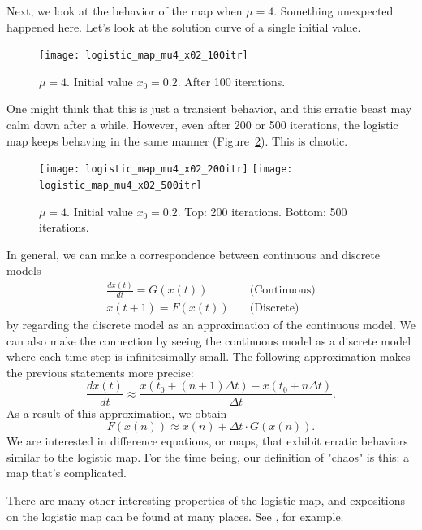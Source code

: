 \documentclass[12pt,twoside]{book}
\begin{document}
Next, we look at the behavior of the map when $\mu = 4$.
Something unexpected happened here.
Let's look at the solution curve of a single initial value.
\begin{figure}[ht]
  \begin{center}
    \texttt{[image: logistic\_map\_mu4\_x02\_100itr]}
  \end{center}
  \caption{
    $\mu = 4$. Initial value $x_0 = 0.2$. After 100 iterations.
  }
  \label{fig:chaotic_map1}
\end{figure}
One might think that this is just a transient behavior, and this erratic beast may calm down after a while.
However, even after 200 or 500 iterations, the logistic map keeps behaving in the same manner (Figure~\ref{fig:chaotic_map2}).
This is chaotic.
\begin{figure}[p]
  \begin{center}
    \texttt{[image: logistic\_map\_mu4\_x02\_200itr]}
    \texttt{[image: logistic\_map\_mu4\_x02\_500itr]}
  \end{center}
  \caption{
    $\mu = 4$. Initial value $x_0 = 0.2$.
    Top: 200 iterations. Bottom: 500 iterations.
  }
  \label{fig:chaotic_map2}
\end{figure}

In general, we can make a correspondence between continuous and discrete models
\begin{equation}
 \begin{aligned}
  \frac{dx(t)}{dt} = G(x(t)) &\quad\mbox{(Continuous)} \\
  x(t + 1) = F(x(t)) &\quad\mbox{(Discrete)}
\end{aligned}
  \label{eqn:intro2}
\end{equation}
by regarding the discrete model as an approximation of the continuous model.
We can also make the connection by seeing the continuous model as a discrete model where each time step is infinitesimally small.
The following approximation makes the previous statements more precise:
\begin{equation*}
  \frac{dx(t)}{dt} \approx \frac{x(t_0 + (n+1)\Delta t) - x(t_0 + n \Delta t)}{\Delta t}.
\end{equation*}
As a result of this approximation, we obtain
\begin{equation*}
  F(x(n)) \approx x(n) + \Delta t \cdot G(x(n)).
\end{equation*}
We are interested in difference equations, or maps, that exhibit erratic behaviors similar to the logistic map.
For the time being, our definition of "chaos" is this: a map that's complicated.
\begin{remark}
  There are many other interesting properties of the logistic map, and expositions on the logistic map can be found at many places.
  See \citep{may1, may2, devaney}, for example.
\end{remark}
\end{document}
